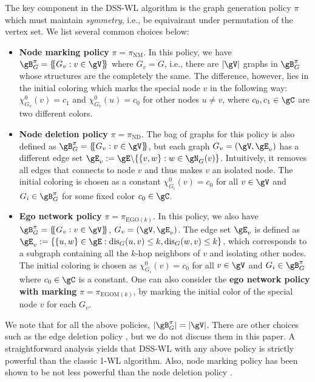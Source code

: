 \documentclass{article} %
\newcommand*{\ldblbrace}{\{\mskip-5mu\{}
\newcommand*{\rdblbrace}{\}\mskip-5mu\}}
\newcommand*{\dis}{{\operatorname{dis}}}
\begin{document}
The key component in the DSS-WL algorithm is the graph generation policy $\pi$ which must maintain \emph{symmetry}, i.e., be equivairant under permutation of the vertex set. We list several common choices below:
\begin{itemize}[topsep=0pt,leftmargin=30pt]
\setlength{\itemsep}{0pt}
    \item \textbf{Node marking policy} $\pi=\pi_{\mathrm{NM}}$. In this policy, we have $\gB^\pi_G=\ldblbrace G_v:v\in\gV\rdblbrace$ where $G_v=G$, i.e., there are $|\gV|$ graphs in $\gB^\pi_G$ whose structures are the completely the same. The difference, however, lies in the initial coloring which marks the special node $v$ in the following way: $\chi_{G_v}^0(v)=c_1$ and $\chi_{G_v}^0(u)=c_0$ for other nodes $u\neq v$, where $c_0,c_1\in\gC$ are two different colors.
    \item \textbf{Node deletion policy} $\pi=\pi_{\mathrm{ND}}$. The bag of graphs for this policy is also defined as $\gB^\pi_G=\ldblbrace G_v:v\in\gV\rdblbrace$, but each graph $G_v=(\gV,\gE_v)$ has a different edge set $\gE_v:=\gE\backslash\{\{v,w\}:w\in\gN_G(v)\}$. Intuitively, it removes all edges that connects to node $v$ and thus makes $v$ an isolated node. The initial coloring is chosen as a constant $\chi_{G_i}^0(v)=c_0$ for all $v\in\gV$ and $G_i\in \gB^\pi_G$ for some fixed color $c_0\in\gC$.
    
    \item \textbf{Ego network policy} $\pi=\pi_{\mathrm{EGO}(k)}$. In this policy, we also have $\gB^\pi_G=\ldblbrace G_v:v\in\gV\rdblbrace$, $G_v=(\gV,\gE_v)$. The edge set $\gE_v$ is defined as $\gE_v:=\{\{u,w\}\in\gE:\dis_G(u,v)\le k,\dis_G(w,v)\le k\}$, which corresponds to a subgraph containing all the $k$-hop neighbors of $v$ and isolating other nodes. The initial coloring is chosen as $\chi_{G_i}^0(v)=c_0$ for all $v\in\gV$ and $G_i\in \gB^\pi_G$ where $c_0\in\gC$ is a constant. One can also consider the \textbf{ego network policy with marking} $\pi=\pi_{\mathrm{EGOM}(k)}$, by marking the initial color of the special node $v$ for each $G_v$.
\end{itemize}

We note that for all the above policies, $|\gB^\pi_G|=|\gV|$. There are other choices such as the edge deletion policy \citep{bevilacqua2022equivariant}, but we do not discuss them in this paper. A straightforward analysis yields that DSS-WL with any above policy is strictly powerful than the classic 1-WL algorithm. Also, node marking policy has been shown to be not less powerful than the node deletion policy \citep{papp2022theoretical}.
\end{document}
